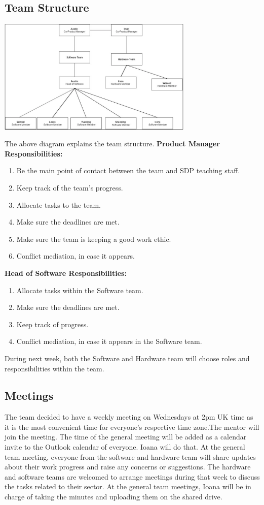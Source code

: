 \documentclass{article}
\begin{document}
\subsection{Team Structure}
\begin{center}
    \includegraphics [width=0.7\textwidth]{Team Structure.png}
\end{center}
The above diagram explains the team structure. 
\newline
\textbf{Product Manager Responsibilities: }
\begin{enumerate} 
    \item Be the main point of contact between the team  and SDP teaching staff. 
    \item Keep track of the team's progress.
    \item Allocate tasks to the team. 
    \item Make sure the deadlines are met. 
    \item Make sure the team is keeping a good work ethic. 
    \item Conflict mediation, in case it appears. 
\end{enumerate}
\textbf{Head of Software Responsibilities: }
\begin{enumerate} 
    \item Allocate tasks within the Software team.
    \item Make sure the deadlines are met. 
    \item Keep track of progress.
    \item Conflict mediation, in case it appears in the Software team. 
\end{enumerate}
During next week, both the Software and Hardware team will choose roles and responsibilities within the team.

\subsection{Meetings}
The team decided to have a weekly meeting on Wednesdays at 2pm UK time as it is the most convenient time for everyone's respective time zone.The mentor will join the meeting. The time of the general meeting will be added as a calendar invite to the Outlook calendar of everyone. Ioana will do that.  At the general team meeting, everyone from the software and hardware team will share updates about their work progress and raise any concerns or suggestions. The hardware and software teams are welcomed to arrange meetings during that week to discuss the tasks related to their sector. At the general team meetings, Ioana will be in charge of taking the minutes and uploading them on the shared drive. 
\end{document}
